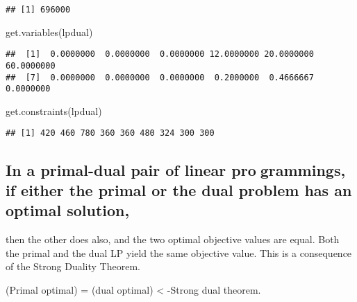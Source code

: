\documentclass[
]{article}
\newenvironment{Shaded}{\begin{snugshade}}{\end{snugshade}}
\newcommand{\FunctionTok}[1]{\textcolor[rgb]{0.00,0.00,0.00}{#1}}
\newcommand{\NormalTok}[1]{#1}
\begin{document}
\begin{verbatim}
## [1] 696000
\end{verbatim}

\begin{Shaded}
\begin{Highlighting}[]
\FunctionTok{get.variables}\NormalTok{(lpdual)}
\end{Highlighting}
\end{Shaded}

\begin{verbatim}
##  [1]  0.0000000  0.0000000  0.0000000 12.0000000 20.0000000 60.0000000
##  [7]  0.0000000  0.0000000  0.0000000  0.2000000  0.4666667  0.0000000
\end{verbatim}

\begin{Shaded}
\begin{Highlighting}[]
\FunctionTok{get.constraints}\NormalTok{(lpdual) }
\end{Highlighting}
\end{Shaded}

\begin{verbatim}
## [1] 420 460 780 360 360 480 324 300 300
\end{verbatim}

\hypertarget{in-a-primal-dual-pair-of-linear-programmings-if-either-the-primal-or-the-dual-problem-has-an-optimal-solution}{%
\subsection{In a primal-dual pair of linear programmings, if either the
primal or the dual problem has an optimal
solution,}\label{in-a-primal-dual-pair-of-linear-programmings-if-either-the-primal-or-the-dual-problem-has-an-optimal-solution}}

then the other does also, and the two optimal objective values are
equal. Both the primal and the dual LP yield the same objective value.
This is a consequence of the Strong Duality Theorem.

(Primal optimal) = (dual optimal) \textless{} -Strong dual theorem.
\end{document}
